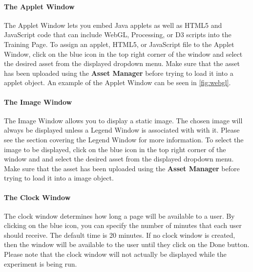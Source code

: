 \documentclass[article]{ij4uq}              %
\begin{document}
\paragraph{The Applet Window}
The Applet Window lets you embed Java applets as well as HTML5 and JavaScript code that can include WebGL, Processing, or D3 scripts into the Training Page.  To assign an applet, HTML5, or JavaScript file to the Applet Window, click on the blue icon in the top right corner of the window and select the desired asset from the displayed dropdown menu.  Make sure that the asset has been uploaded using the \textbf{Asset Manager} before trying to load it into a applet object.  An example of the Applet Window can be seen in \ref{fig:webgl}.


\paragraph{The Image Window}
The Image Window allows you to display a static image.  The chosen image will always be displayed unless a Legend Window is associated with with it.  Please see the section covering the Legend Window for more information.  To select the image to be displayed, click on the blue icon in the top right corner of the window and and select the desired asset from the displayed dropdown menu.  Make sure that the asset has been uploaded using the \textbf{Asset Manager} before trying to load it into a image object.

\paragraph{The Clock Window}
The clock window determines how long a page will be available to a user. By clicking on the blue icon, you can specify the number of minutes that each user should receive. The default time is 20 minutes. If no clock window is created, then the window will be available to the user until they click on the Done button. Please note that the clock window will not actually be displayed while the experiment is being run.
\end{document}
